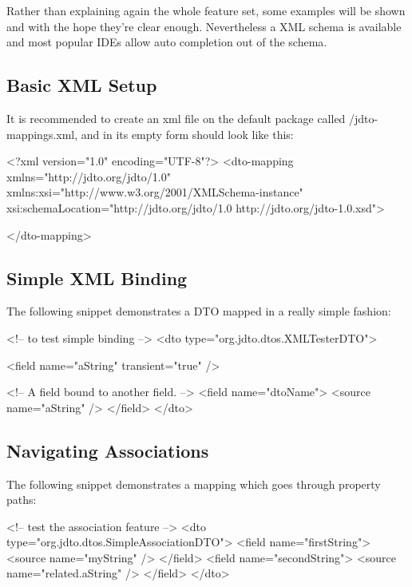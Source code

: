 \documentclass[11pt]{article}
\newcommand{\DEFAULTCONFIG}{/jdto-mappings.xml\xspace}
\begin{document}
Rather than explaining again the whole feature set, some examples will be shown and with the hope they're clear enough. Nevertheless a XML schema is available and most popular IDEs allow auto completion out of the schema.


\subsection{Basic XML Setup}

It is recommended to create an xml file on the default package called \DEFAULTCONFIG, and in its empty form should look like this:

\begin{xml}
<?xml version="1.0" encoding="UTF-8"?>
<dto-mapping 
    xmlns="http://jdto.org/jdto/1.0" 
    xmlns:xsi="http://www.w3.org/2001/XMLSchema-instance"
    xsi:schemaLocation="http://jdto.org/jdto/1.0 
                        http://jdto.org/jdto-1.0.xsd">
        
</dto-mapping>
\end{xml}


\subsection{Simple XML Binding}

The following snippet demonstrates a DTO mapped in a really simple fashion:

\begin{xml}
<!-- to test simple binding -->
<dto type="org.jdto.dtos.XMLTesterDTO">

    <field name="aString" transient="true" />

    <!-- A field bound to another field. -->
    <field name="dtoName">
        <source name="aString" />
    </field>
</dto>
\end{xml}

\subsection{Navigating Associations}

The following snippet demonstrates a mapping which goes through property paths:

\begin{xml}
<!-- test the association feature -->
<dto type="org.jdto.dtos.SimpleAssociationDTO">
    <field name="firstString">
        <source name="myString" />
    </field>
    <field name="secondString">
        <source name="related.aString" />
    </field>
</dto>
\end{xml}
\end{document}
